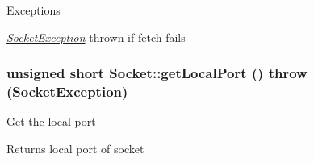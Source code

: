 \begin{DoxyExceptions}{Exceptions}
\item[{\em \hyperlink{classSocketException}{SocketException}}]thrown if fetch fails \end{DoxyExceptions}
\hypertarget{classSocket_ae01143b667d69483a2f53d0f4ce7eeed}{
\subsubsection[{getLocalPort}]{\setlength{\rightskip}{0pt plus 5cm}unsigned short Socket::getLocalPort ()  throw ({\bf SocketException})}}
\label{classSocket_ae01143b667d69483a2f53d0f4ce7eeed}
Get the local port \begin{DoxyReturn}{Returns}
local port of socket 
\end{DoxyReturn}

